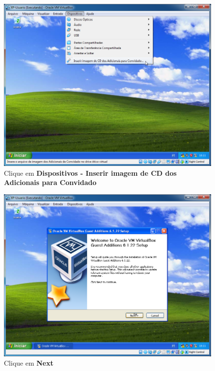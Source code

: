 \documentclass[10pt]{article}
\begin{document}
\begin{figure}[H]
    \centering
    \caption{Clique em \textbf{\textbf{Dispositivos - Inserir imagem de CD dos Adicionais para Convidado}}}
    \label{fig:3115}
    \includegraphics[width=\linewidth]{images/ativacao_das_maquinas_virtuais/configuracao_inicial_das_maquinas_virtuais/015.png}
\end{figure}
\begin{figure}[H]
    \centering
    \caption{Clique em \textbf{Next}}
    \label{fig:3116}
    \includegraphics[width=\linewidth]{images/ativacao_das_maquinas_virtuais/configuracao_inicial_das_maquinas_virtuais/016.png}
\end{figure}
\end{document}
